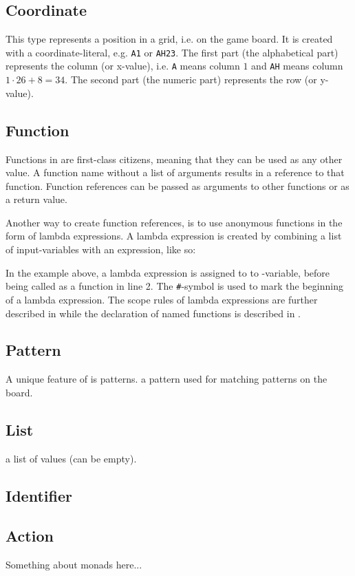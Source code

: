 
\subsection{Coordinate}
This type represents a position in a grid, i.e. on the game board. It is created with
a coordinate-literal, e.g. \texttt{A1} or \texttt{AH23}. The first part (the alphabetical part)
represents the column (or x-value), i.e. \texttt{A} means column $1$ and \texttt{AH} means
column $1 \cdot 26 + 8 = 34$. The second part (the numeric part) represents the row (or y-value).


\subsection{Function}
Functions in \productname{} are first-class citizens, meaning that they can be used as any
other value. A function name without a list of arguments results in a reference to that
function. Function references can be passed as arguments to other functions or as a return
value.

Another way to create function references, is to use anonymous functions in the form
of lambda expressions. A lambda expression is created by combining a list of input-variables
with an expression, like so:


In the example above, a lambda expression is assigned to to -variable, before
being called as a function in line 2. The \texttt{\#}-symbol is used to mark the beginning
of a lambda expression. The scope rules of lambda expressions are further described in 
while the declaration of named functions is described in .

\subsection{Pattern}
A unique feature of \productname{} is patterns.
a pattern used for matching patterns on the board.
\subsection{List}
a list of values (can be empty).

\subsection{Identifier}

\subsection{Action}

Something about monads here...
